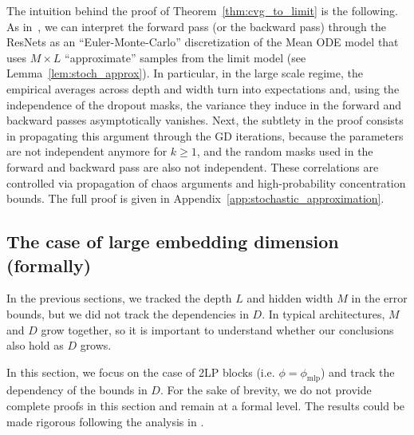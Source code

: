 \documentclass[a4paper,11pt]{article}
\newcommand{\1}{\mathbbm{1}}
\theoremstyle{definition}
\theoremstyle{remark}
\begin{document}
The intuition behind the proof of Theorem~\ref{thm:cvg_to_limit} is the following. As in~\cite{chizat2025hidden}, we can interpret the forward pass (or the backward pass) through the ResNets as an ``Euler-Monte-Carlo'' discretization of the Mean ODE model that uses $M\times L$ ``approximate'' samples from the limit model (see Lemma~\ref{lem:stoch_approx}). In particular, in the large scale regime, the empirical averages across depth and width turn into expectations and, using the independence of the dropout masks, the variance they induce in the forward and backward passes asymptotically vanishes. Next, the subtlety in the proof consists in propagating this argument through the GD iterations, because the parameters are not independent anymore for $k\geq 1$, and the random masks used in the forward and backward pass are also not independent. These correlations are controlled via propagation of chaos arguments and high-probability concentration bounds.
The full proof is given in Appendix~\ref{app:stochastic_approximation}. 




\subsection{The case of large embedding dimension (formally)}\label{sec:case_of_large_D}

In the previous sections, we tracked the depth $L$ and hidden width $M$ in the error bounds, but we did not track the dependencies in $D$. In typical architectures, $M$ and $D$ grow together, so it is important to understand whether our conclusions also hold as $D$ grows. 

In this section, we focus on the case of 2LP blocks (i.e. $\phi = \phi_{\mathrm{mlp}}$) and track the dependency of the bounds in $D$. For the sake of brevity, we do not provide complete proofs in this section and remain at a formal level. The results could be made rigorous following the analysis in \cite[Theorem 3]{chizat2025hidden}.
\end{document}
